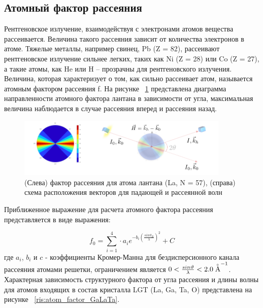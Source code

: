 \subsection{Атомный фактор рассеяния}
Рентгеновское излучение, взаимодействуя с электронами атомов вещества рассеивается.
Величина такого рассеяния зависит от количества электронов в атоме. Тяжелые металлы,
 например свинец, Pb (Z = 82), рассеивают рентгеновское излучение сильнее легких,
 таких как Ni (Z = 28) или  Co (Z = 27), а такие атомы, как He или H – прозрачны
 для рентгеновского излучения. Величина, которая характеризует о том, как сильно
 рассеивает атом, называется атомным фактором рассеяния f.
На рисунке ~\ref{ris:atom_factor} представлена диаграмма направленности атомного
фактора лантана в зависимости от угла, максимальная величина наблюдается в случае
 рассеяния вперед и рассеяния назад.

\begin{figure}[h]
  \centering
  \includegraphics[width=0.9\textwidth]{images/atom_factor.png}
  \caption{ (Слева) фактор рассеяния для атома лантана (La, N = 57), (справа)
  схема расположения векторов для падающей и рассеянной волн}
  \label{ris:atom_factor}
\end{figure}

Приближенное выражение для расчета атомного фактора рассеяния
представляется \cite{International_Tables} в виде выражения:

\begin{equation}
  f_0 = \sum_{i=1}^{4} \cdot a_i e^{ -b_i (\frac{sin \vartheta_B}{\lambda})^2} + C
 \end{equation}
где $a_i$, $b_i$ и $c$ - коэффициенты Кромер-Манна для бездисперсионного канала рассеяния атомами решетки,
ограничением является $0<\frac{sin\vartheta}{\lambda}<2.0 \angstrom ^{-1}$.
 Характерная зависимость структурного фактора от угла рассеяния и длины волны
для атомов входящих в состав кристалла LGT (La, Ga, Ta, O) представлена на рисунке ~\ref{ris:atom_factor_GaLaTa}.

